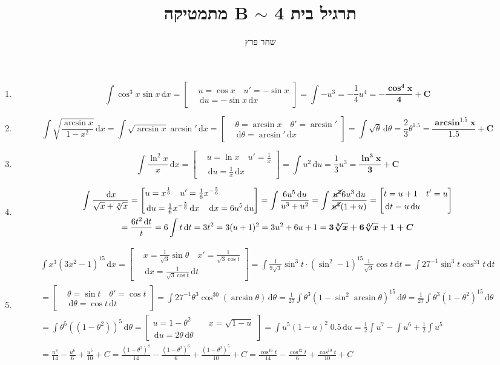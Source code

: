 \documentclass[]{article}
\author{שחר פרץ}
\title{מתמטיקה B $\sim$ תרגיל בית 4}
\newcommand\lnx   {\ln x}
\newcommand\cosx  {\cos x}
\newcommand\sinx  {\sin x}
\newcommand\sint  {\sin \theta}
\newcommand\dx    {\,\mathrm{d}x}
\newcommand\dt    {\,\mathrm{d}t}
\newcommand\dtt   {\,\mathrm{d}\theta}
\newcommand\du    {\,\mathrm{d}u}
\newcommand\pu[3]{\csb{\begin{aligned}
			&u = #1 \quad u' = #2 \\
			&\du = #2 #3
	\end{aligned}}}
\newcommand\ptt[3]{\csb{\begin{aligned}
			&\theta = #1 \quad \theta' = #2 \\
			&\dtt = #2 #3
\end{aligned}}}
\newcommand\ptu[3]{\csb{\begin{aligned}
			&t = #1 \quad t' = #2 \\
			&\dt = #2 \du #3
\end{aligned}}}
\newcommand\px[3]{\csb{\begin{aligned}
&x = #1 \quad x' = #2 \\
&\dx = #2 #3
\end{aligned}}}
\newcommand\ta    {\theta}
\newcommand\op    {^{-1}}
\newcommand\csb[1]    {\left [ #1 \right ]}
\begin{document}
	\maketitle
	
	\section{}
	\begin{enumerate}
		\item 
		\[ \int \cos^3x \sinx \dx = \pu{\cosx}{-\sinx}{\dx} = \int -u^3 = -\frac{1}{4}u^4 = \bm{-\frac{\cos^4x}{4} + C} \]
		\item 
		\[ \int \sqrt{\frac{\arcsin x}{1 - x^2}} \dx = \int \sqrt{\arcsin x} \arcsin' \dx = \ptt{\arcsin x}{\arcsin'}{\dx} = \int \sqrt\theta \dtt = \frac{2}{3}\theta^{1.5} = \bm{\frac{\arcsin^{1.5} x}{1.5} + C} \]
		\item 
		\[ \int \frac{\ln^2x}{x} \dx = \pu{\lnx}{\tfrac{1}{x}}{\dx} = \int u^2 \du = \frac{1}{3}u^3 = \bm{\frac{\ln^3x}{3} + C} \]
		\item 
		\begin{multline*}
			\int \frac{\dx}{\sqrt x + \sqrt[3]{x}} = \pu{x^{\frac{1}{6}}}{\tfrac{1}{6}x^{-\frac{5}{6}}}{\dx \quad \dx = 6u^5\du } = \int \frac{6u^5\du}{u^3 + u^2} = \int \frac{\cancel{u^2}6u^3\du}{\cancel{u^2}(1 + u)} = \ptu{u + 1}{u}{} \\
			 = \frac{6t^2\dt}{t} = 6 \int t \dt = 3t^2 = 3(u + 1)^2 = 3u^2 + 6u + 1 = \bm{3\sqrt[3]{x} + 6\sqrt[6]{x} + 1 + C}
		\end{multline*}
		\item 
		\begin{multline*}
			\int x^3(3x^2 - 1)^{15}\dx = \px{\tfrac{1}{\sqrt3}\sint}{\tfrac{1}{\sqrt3\cos t}}{\dt} = \int \frac{1}{9\sqrt3}\sin^3 t \cdot (\sin^2 - 1)^{15} \frac{1}{\sqrt3}\cos t\dt = \int 27\op \sin^3 t \cos^{31}t \dt \\
			= \ptt{\sin t}{\cos t}{\dt} = \int 27\op \ta^3 \cos^{30}(\arcsin \ta)\dtt = \frac{1}{27} \int \ta^3(1 - \sin^2\arcsin\ta)^{15}\dtt = \frac{1}{27} \int \ta^3(1 - \ta^2)^{15}\dtt \\
			= \int \ta^5((1 - \ta^2))^5\dtt = \csb{\begin{aligned}
					u = 1 - \ta^2 & \quad x = \sqrt{1 - u} \\
					\du = 2\ta\dtt
			\end{aligned}} = \int u^5(1 - u)^2 \; 0.5\du  = \frac{1}{2}\int u^7 - \int u^6 + \frac{1}{2} \int u^5 \\
			= \frac{u^8}{14} - \frac{u^6}{6} + \frac{u^5}{10} + C = \frac{(1 - \ta^2)^8}{14} - \frac{(1 - \ta^2)^6}{6} + \frac{(1 - \ta^2)^5}{10} + C = \frac{\cos^{16}t}{14} - \frac{\cos^{12}t}{6} + \frac{\cos^{10}t}{10} +C \\

\end{multline*}
\end{enumerate}
\end{document}
